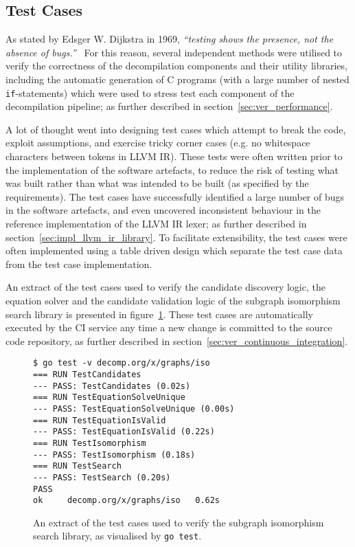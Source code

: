 
\subsection{Test Cases}

As stated by Edsger W. Dijkstra in 1969, \textit{``testing shows the presence, not the absence of bugs.''}~\cite{absence_of_bugs_quote} For this reason, several independent methods were utilised to verify the correctness of the decompilation components and their utility libraries, including the automatic generation of C programs (with a large number of nested \texttt{if}-statements) which were used to stress test each component of the decompilation pipeline; as further described in section~\ref{sec:ver_performance}.

A lot of thought went into designing test cases which attempt to break the code, exploit assumptions, and exercise tricky corner cases (e.g. no whitespace characters between tokens in LLVM IR). These tests were often written prior to the implementation of the software artefacts, to reduce the risk of testing what was built rather than what was intended to be built (as specified by the requirements). The test cases have successfully identified a large number of bugs in the software artefacts, and even uncovered inconsistent behaviour in the reference implementation of the LLVM IR lexer; as further described in section~\ref{sec:impl_llvm_ir_library}. To facilitate extensibility, the test cases were often implemented using a table driven design which separate the test case data from the test case implementation.

An extract of the test cases used to verify the candidate discovery logic, the equation solver and the candidate validation logic of the subgraph isomorphism search library is presented in figure~\ref{fig:iso_test_cases}. These test cases are automatically executed by the CI service any time a new change is committed to the source code repository, as further described in section~\ref{sec:ver_continuous_integration}.

\begin{figure}[htbp]
	\begin{center}
		\begin{BVerbatim}
$ go test -v decomp.org/x/graphs/iso
=== RUN TestCandidates
--- PASS: TestCandidates (0.02s)
=== RUN TestEquationSolveUnique
--- PASS: TestEquationSolveUnique (0.00s)
=== RUN TestEquationIsValid
--- PASS: TestEquationIsValid (0.22s)
=== RUN TestIsomorphism
--- PASS: TestIsomorphism (0.18s)
=== RUN TestSearch
--- PASS: TestSearch (0.20s)
PASS
ok     decomp.org/x/graphs/iso   0.62s
		\end{BVerbatim}
		\caption{An extract of the test cases used to verify the subgraph isomorphism search library, as visualised by \texttt{go test}.}
		\label{fig:iso_test_cases}
	\end{center}
\end{figure}



